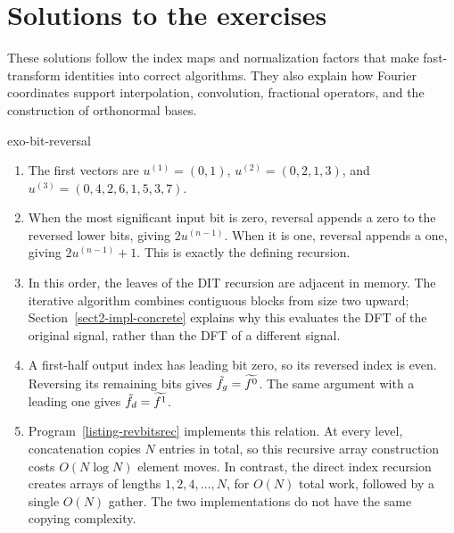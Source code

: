 \clearpage
\section{Solutions to the exercises}
\label{sec-solutions-3-dft}

These solutions follow the index maps and normalization factors that make
fast-transform identities into correct algorithms. They also explain how
Fourier coordinates support interpolation, convolution, fractional
operators, and the construction of orthonormal bases.

\begin{correction}{exo-bit-reversal}
\begin{enumerate}
\item The first vectors are
$u^{(1)}=(0,1)$, $u^{(2)}=(0,2,1,3)$, and
$u^{(3)}=(0,4,2,6,1,5,3,7)$.
\item When the most significant input bit is zero, reversal appends a zero
to the reversed lower bits, giving $2u^{(n-1)}$. When it is one, reversal
appends a one, giving $2u^{(n-1)}+1$. This is exactly the defining recursion.
\item In this order, the leaves of the DIT recursion are adjacent in memory.
The iterative algorithm combines contiguous blocks from size two upward;
Section~\ref{sect2-impl-concrete} explains why this evaluates the DFT of the
original signal, rather than the DFT of a different signal.
\item A first-half output index has leading bit zero, so its reversed index
is even. Reversing its remaining bits gives $\tilde{f}_g=\widetilde{f^0}$.
The same argument with a leading one gives $\tilde{f}_d=\widetilde{f^1}$.
\item Program~\ref{listing-revbitsrec} implements this relation.
At every level, concatenation copies $N$ entries in total, so this recursive
array construction costs $O(N\log N)$ element moves.
In contrast, the direct index recursion creates arrays of lengths
$1,2,4,\ldots,N$, for $O(N)$ total work, followed by a single $O(N)$ gather.
The two implementations do not have the same copying complexity.
\begin{listing}[H]
\caption{Recursive permutation of a vector into bit-reversed order.}
\label{listing-revbitsrec}
\end{listing}
\end{enumerate}
\end{correction}

